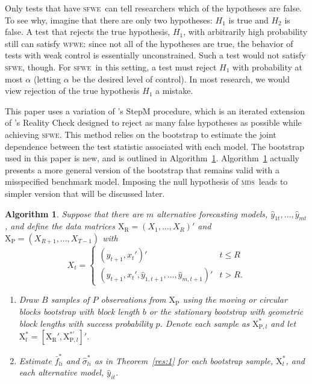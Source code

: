 \documentclass[12pt,fleqn]{article}
\newcommand\citepos[2][]{\citeauthor{#2}'s \citeyearpar[#1]{#2}}
\newtheorem{alg}{Algorithm}
\theoremstyle{definition}
\newcommand{\X}{\ensuremath{\mathrm{X}}}
\newcommand{\R}{\ensuremath{\mathrm{R}}}
\newcommand{\p}{\ensuremath{\mathrm{P}}}
\newcommand{\mds}{\textsc{mds}}
\newcommand{\sfwe}{\textsc{sfwe}}
\newcommand{\wfwe}{\textsc{wfwe}}
\begin{document}
Only tests that have \sfwe\ can tell researchers which of the
hypotheses are false.  To see why, imagine that there are only two
hypotheses: $H_1$ is true and $H_2$ is false.  A test that rejects the
true hypothesis, $H_1$, with arbitrarily high probability still can
satisfy \wfwe: since not all of the hypotheses are true, the behavior
of tests with weak control is essentially unconstrained.  Such a test
would not satisfy \sfwe, though.  For \sfwe\ in this setting, a test
must reject $H_1$ with probability at most $\alpha$ (letting $\alpha$
be the desired level of control).  In most research, we would view
rejection of the true hypothesis $H_1$ a mistake.

This paper uses a variation of \citepos{RoW:05} StepM procedure, which
is an iterated extension of \citepos{Whi:00} Reality Check designed to
reject as many false hypotheses as possible while achieving \sfwe.
This method relies on the bootstrap to estimate the joint dependence
between the test statistic associated with each model.  The bootstrap
used in this paper is new, and is outlined in Algorithm~\ref{alg:1}.
Algorithm~\ref{alg:1} actually presents a more general version of the
bootstrap that remains valid with a misspecified benchmark model.
Imposing the null hypothesis of \mds\ leads to simpler version that
will be discussed later.
\begin{alg}\label{alg:1}
  Suppose that there are $m$ alternative forecasting models,
  $\hat{y}_{1t},\dots, \hat{y}_{mt}$, and define the data matrices
  $\X_\R = (X_1,\dots,X_R)'$ and $\X_{\p} = (X_{R+1},\dots,X_{T-1})$
  with
  \begin{equation*}
    X_t = \begin{cases}
      (y_{t+1}, x_t')' & t \leq R \\
      (y_{t+1}, x_t', \hat{y}_{1,t+1}, \dots, \hat{y}_{m,t+1})' & t > R.
    \end{cases}
  \end{equation*}
  \begin{enumerate}
  \item Draw $B$ samples of $P$ observations from $\X_{\p}$ using the
    moving or circular blocks bootstrap with block length $b$ or the
    stationary bootstrap with geometric block lengths with success
    probability $p$.  Denote each sample as $\X_{\p, l}^{*}$ and let
    $\X_l^{*} = [\X_{\R}', \X_{\p,l}^{*\prime}]'$.
  \item Estimate $\bar{f}^{*}_{li}$ and $\hat{\sigma}_{li}^{*}$ as in
    Theorem~\ref{res:1} for each bootstrap sample, $\X^{*}_l$, and each
    alternative model, $\hat{y}_{it}$.
  \end{enumerate}
\end{alg}
\end{document}
